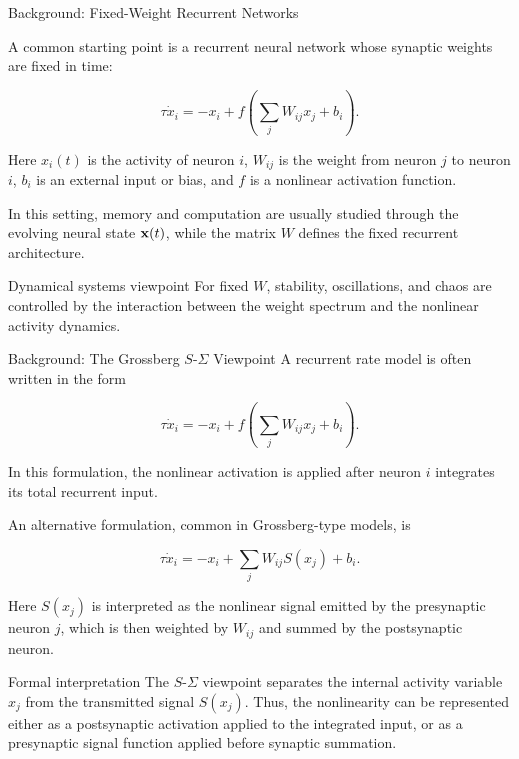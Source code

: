 \documentclass[
11pt,notheorems,hyperref={pdfauthor=whatever}
]{beamer}
\begin{document}
\begin{frame}{Background: Fixed-Weight Recurrent Networks}
\small

A common starting point is a recurrent neural network whose synaptic weights
are fixed in time:

\[
\tau \dot{x}_i
=
-x_i
+
f\left(\sum_j W_{ij}x_j+b_i\right).
\]

Here \(x_i(t)\) is the activity of neuron \(i\), \(W_{ij}\) is the weight from
neuron \(j\) to neuron \(i\), \(b_i\) is an external input or bias, and \(f\)
is a nonlinear activation function.

\vspace{0.5em}

In this setting, memory and computation are usually studied through the
evolving neural state \({\bf x}(t)\), while the matrix \(W\) defines the fixed
recurrent architecture.

\vspace{0.5em}

\begin{block}{Dynamical systems viewpoint}
For fixed \(W\), stability, oscillations, and chaos are controlled by the
interaction between the weight spectrum and the nonlinear activity dynamics.
\end{block}

\end{frame}

\begin{frame}{Background: The Grossberg \(S\)-\(\Sigma\) Viewpoint}
A recurrent rate model is often written in the form

\[
\tau \dot{x}_i
=
-x_i
+
f\left(\sum_j W_{ij}x_j+b_i\right).
\]

In this formulation, the nonlinear activation is applied after neuron \(i\)
integrates its total recurrent input.

\vspace{0.7em}

An alternative formulation, common in Grossberg-type models, is

\[
\tau \dot{x}_i
=
-x_i
+
\sum_j W_{ij}S(x_j)
+
b_i.
\]

Here \(S(x_j)\) is interpreted as the nonlinear signal emitted by the
presynaptic neuron \(j\), which is then weighted by \(W_{ij}\) and summed by
the postsynaptic neuron.

\vspace{0.7em}

\begin{block}{Formal interpretation}
The \(S\)-\(\Sigma\) viewpoint separates the internal activity variable
\(x_j\) from the transmitted signal \(S(x_j)\). Thus, the nonlinearity can be
represented either as a postsynaptic activation applied to the integrated
input, or as a presynaptic signal function applied before synaptic summation.
\end{block}
\end{frame}
\end{document}
